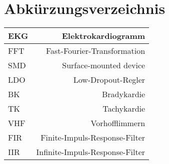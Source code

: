 
\section{Abkürzungsverzeichnis} 

\begin{tabular}[]{l|r}
EKG & Elektrokardiogramm 
\\
\hline
FFT & Fast-Fourier-Transformation 
\\
\hline
SMD & Surface-mounted device 
\\
\hline
LDO & Low-Dropout-Regler 
\\
\hline
BK & Bradykardie 
\\
\hline
TK & Tachykardie
\\
\hline
VHF & Vorhofflimmern
\\
\hline
FIR & Finite-Impuls-Response-Filter
\\
\hline
IIR & Infinite-Impuls-Response-Filter
\\

\end{tabular}
